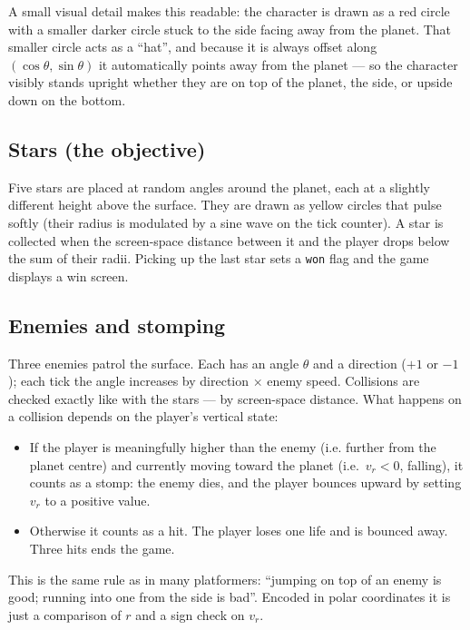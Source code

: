 A small visual detail makes this readable: the character is drawn as a
red circle with a smaller darker circle stuck to the side facing away
from the planet. That smaller circle acts as a ``hat'', and because it
is always offset along $(\cos\theta, \sin\theta)$ it automatically
points away from the planet --- so the character visibly stands
upright whether they are on top of the planet, the side, or upside
down on the bottom.

\subsection*{Stars (the objective)}

Five stars are placed at random angles around the planet, each at a
slightly different height above the surface. They are drawn as yellow
circles that pulse softly (their radius is modulated by a sine wave on
the tick counter). A star is collected when the screen-space distance
between it and the player drops below the sum of their radii. Picking
up the last star sets a \texttt{won} flag and the game displays a win
screen.

\subsection*{Enemies and stomping}

Three enemies patrol the surface. Each has an angle $\theta$ and a
direction ($+1$ or $-1$); each tick the angle increases by direction
$\times$ enemy speed. Collisions are checked exactly like with the
stars --- by screen-space distance. What happens on a collision
depends on the player's vertical state:

\begin{itemize}
    \item If the player is meaningfully higher than the enemy (i.e.
    further from the planet centre) and currently moving toward the
    planet (i.e.\ $v_r < 0$, falling), it counts as a stomp: the
    enemy dies, and the player bounces upward by setting $v_r$ to a
    positive value.
    \item Otherwise it counts as a hit. The player loses one life and
    is bounced away. Three hits ends the game.
\end{itemize}

This is the same rule as in many platformers: ``jumping on top of an
enemy is good; running into one from the side is bad''. Encoded in
polar coordinates it is just a comparison of $r$ and a sign check on
$v_r$.

